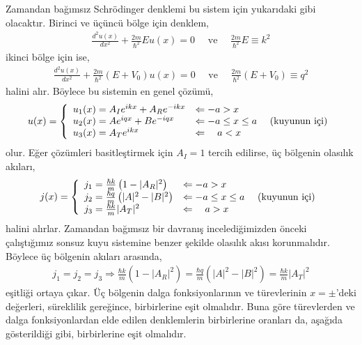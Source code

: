 \documentclass[00_kitap.tex]{subfiles}
\begin{document}
Zamandan bağımsız Schrödinger denklemi bu sistem için yukarıdaki gibi olacaktır. Birinci ve üçüncü bölge için denklem,
\begin{align}
\frac { d ^ { 2 } u ( x ) } { d x ^ { 2 } } +  \frac { 2 m} { \hbar ^ { 2 } } E u ( x ) = 0 \quad \text{ ve } \quad \frac { 2 m} { \hbar ^ { 2 } } E \equiv k ^ { 2 }
\end{align}
ikinci bölge için ise,
\begin{align}
\frac { d ^ { 2 } u ( x ) } { d x ^ { 2 } } +  \frac { 2 m} { \hbar ^ { 2 } }  \left( E + V _ { 0 } \right) u ( x ) = 0 \quad \text{ ve } \quad \frac { 2 m} { \hbar ^ { 2 } }  \left( E + V _ { 0 } \right) \equiv q ^ { 2 }
\end{align}
halini alır. Böylece bu sistemin en genel çözümü,
\begin{align}
u ( x )  = \left\{ 
\begin{array} { l l } 
{u_1(x) = A_I e^{i k x} + A_R e^{-i k x} } & {\Leftarrow -a > x } \\
{u_2(x) = A e^{i q x} + B e^{-i q x} } & {\Leftarrow -a \leq x \leq a } \quad \text{ (kuyunun içi)} \\
{u_3(x) = A_T e^{i k x}} & {\Leftarrow \quad a < x }
\end{array} \right. 
\end{align}
olur. Eğer çözümleri basitleştirmek için $A_I=1$ tercih edilirse, üç bölgenin olasılık akıları,
\begin{align}
j ( x )  = \left\{ 
\begin{array} { l l } 
{j_1 = \frac{\hbar k}{m}\left(1-|A_R|^{2}\right) } & {\Leftarrow -a > x } \\
{j_2 = \frac{\hbar q}{m}\left(|A|^{2}-|B|^{2}\right) } & {\Leftarrow -a \leq x \leq a } \quad \text{ (kuyunun içi)} \\
{j_3 = \frac{\hbar k}{m}|A_T|^{2}} & {\Leftarrow \quad a > x }
\end{array} \right. 
\end{align}
halini alırlar. Zamandan bağımsız bir davranış incelediğimizden önceki çalıştığımız sonsuz kuyu sistemine benzer şekilde olasılık akısı korunmalıdır. Böylece üç bölgenin akıları arasında,
\begin{align}
	j_1 = 	j_2 = 	j_3 \Longrightarrow \frac{\hbar k}{m}\left(1-|A_R|^{2}\right)=\frac{\hbar q}{m}\left(|A|^{2}-|B|^{2}\right)=\frac{\hbar k}{m}|A_T|^{2}
	\label{eq:sonlukuyu_j1j2j3}
\end{align}
eşitliği ortaya çıkar. Üç bölgenin dalga fonksiyonlarının ve türevlerinin $x=\pm$'deki değerleri, süreklilik gereğince, birbirlerine eşit olmalıdır. Buna göre türevlerden ve dalga fonksiyonlardan elde edilen denklemlerin birbirlerine oranları da, aşağıda gösterildiği gibi, birbirlerine eşit olmalıdır. 
\end{document}
